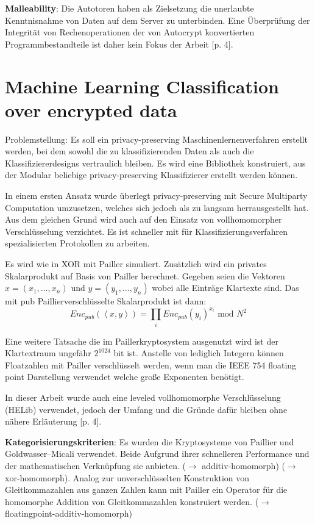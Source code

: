 \textbf{Malleability}: Die Autotoren haben als Zielsetzung die unerlaubte Kenntnisnahme von Daten auf dem Server zu unterbinden. Eine Überprüfung der Integrität von Rechenoperationen der von Autocrypt konvertierten Programmbestandteile ist daher kein Fokus der Arbeit [p. 4].

\section{Machine Learning Classification over encrypted data} \cite{bost2015machine}
Problemstellung: Es soll ein privacy-preserving Maschinenlernenverfahren erstellt werden, bei dem sowohl die zu klassifizierenden Daten als auch die Klassifiziererdesigns vertraulich bleiben. Es wird eine Bibliothek konstruiert, aus der Modular beliebige privacy-preserving Klassifizierer erstellt werden können.

In einem ersten Ansatz wurde überlegt privacy-preserving mit Secure Multiparty Computation umzusetzen, welches sich jedoch als zu langsam herrausgestellt hat. Aus dem gleichen Grund wird auch auf den Einsatz von vollhomomorpher Verschlüsselung verzichtet. Es ist schneller mit für Klassifizierungsverfahren spezialisierten Protokollen zu arbeiten. 

Es wird wie in \cite{tople2013autocrypt} XOR mit Pailler simuliert. Zusätzlich wird ein privates Skalarprodukt auf Basis von Pailler berechnet.
Gegeben seien die Vektoren $x=(x_1,\ldots,x_n)$ und $y=(y_1,\ldots,y_n)$  wobei alle Einträge Klartexte sind. Das mit pub Paillierverschlüsselte Skalarprodukt ist dann:
\begin{equation}
Enc_{pub}(\left\langle x,y\right\rangle )=\prod_i Enc_{pub}(y_i)^{x_i} \text{ mod } N^2
\end{equation}

Eine weitere Tatsache die im Paillerkryptosystem ausgenutzt wird ist der Klartextraum ungefähr $2^{1024}$ bit ist. Anstelle von lediglich Integern können Floatzahlen mit Pailler verschlüsselt werden, wenn man die IEEE 754 floating point Darstellung verwendet welche große Exponenten benötigt.

In dieser Arbeit wurde auch eine leveled vollhomomorphe Verschlüsselung (HELib) verwendet, jedoch der Umfang und die Gründe dafür bleiben ohne nähere Erläuterung [p. 4].

\textbf{Kategorisierungskriterien}: Es wurden die Kryptosysteme von Paillier und Goldwasser–Micali verwendet. Beide Aufgrund ihrer schnelleren Performance und der mathematischen Verknüpfung sie anbieten. ($\rightarrow$ additiv-homomorph) ($\rightarrow$ xor-homomorph). Analog zur unverschlüsselten Konstruktion von Gleitkommazahlen aus ganzen Zahlen kann mit  Pailler ein Operator für die homomorphe Addition von Gleitkommazahlen konstruiert werden. ($\rightarrow$ floatingpoint-additiv-homomorph)

